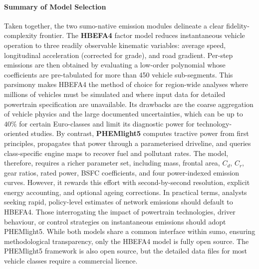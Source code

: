 \paragraph{Summary of Model Selection}  
Taken together, the two \ac{sumo}-native emission modules delineate a clear fidelity-complexity frontier. The \textbf{HBEFA4} factor model reduces instantaneous vehicle operation to three readily observable kinematic variables: average speed, longitudinal acceleration (corrected for grade), and road gradient. Per-step emissions are then obtained by evaluating a low-order polynomial whose coefficients are pre-tabulated for more than 450 vehicle sub-segments. This parsimony makes HBEFA4 the method of choice for region-wide analyses where millions of vehicles must be simulated and where input data for detailed powertrain specification are unavailable. Its drawbacks are the coarse aggregation of vehicle physics and the large documented uncertainties, which can be up to $40\%$ for certain Euro-classes and limit its diagnostic power for technology-oriented studies.
\mynewline
By contrast, \textbf{PHEMlight5} computes tractive power from first principles, propagates that power through a parameterised driveline, and queries class-specific engine maps to recover fuel and pollutant rates. The model, therefore, requires a richer parameter set, including mass, frontal area, $C_{d}$, $C_{r}$, gear ratios, rated power, BSFC coefficients, and four power-indexed emission curves. However, it rewards this effort with second-by-second resolution, explicit energy accounting, and optional ageing corrections.
\mynewline
In practical terms, analysts seeking rapid, policy-level estimates of network emissions should default to HBEFA4. Those interrogating the impact of powertrain technologies, driver behaviour, or control strategies on instantaneous emissions should adopt PHEMlight5. While both models share a common interface within \ac{sumo}, ensuring methodological transparency, only the HBEFA4 model is fully open source. The PHEMlight5 framework is also open source, but the detailed data files for most vehicle classes require a commercial licence.


